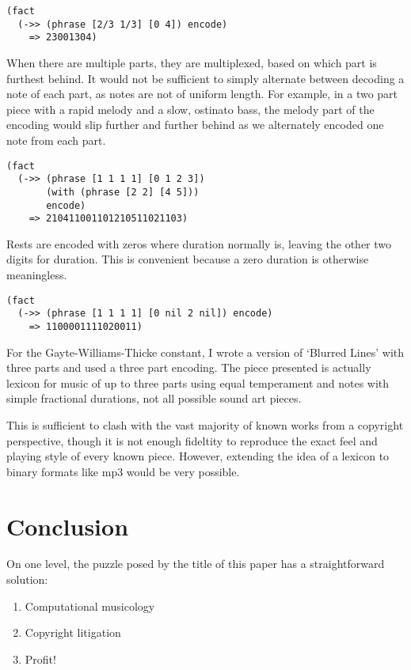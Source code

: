 \documentclass[numbers]{sigplanconf}
\begin{document}
\begin{verbatim}
(fact
  (->> (phrase [2/3 1/3] [0 4]) encode)
    => 23001304)
\end{verbatim}

When there are multiple parts, they are multiplexed, based on which part is furthest behind. It would not be sufficient to
simply alternate between decoding a note of each part, as notes are not of uniform length. For example, in a two part piece
with a rapid melody and a slow, ostinato bass, the melody part of the encoding would slip further and further behind as
we alternately encoded one note from each part.

\begin{verbatim}
(fact
  (->> (phrase [1 1 1 1] [0 1 2 3])
       (with (phrase [2 2] [4 5]))
       encode)
    => 210411001101210511021103)
\end{verbatim}

Rests are encoded with zeros where duration normally is, leaving the other two digits for duration.
This is convenient because a zero duration is otherwise meaningless.

\begin{verbatim}
(fact
  (->> (phrase [1 1 1 1] [0 nil 2 nil]) encode)
    => 1100001111020011)
\end{verbatim}

For the Gayte-Williams-Thicke constant, I wrote a version of `Blurred Lines' with three parts and used a three part encoding.
The piece presented is actually lexicon for music of up to three parts using equal temperament and notes with simple
fractional durations, not all possible sound art pieces.

This is sufficient to clash with the vast majority of known works from a copyright perspective, though
it is not enough fideltity to reproduce the exact feel and playing style of every known piece. However, extending the idea of
a lexicon to binary formats like mp3 would be very possible.

\section{Conclusion}

On one level, the puzzle posed by the title of this paper has a straightforward solution:
\begin{enumerate}
    \item Computational musicology
    \item Copyright litigation
    \item Profit!
\end{enumerate}
\end{document}

